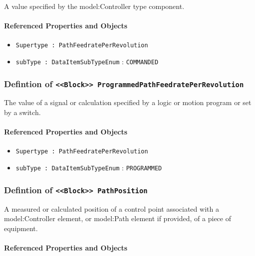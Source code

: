 \FloatBarrier

A value specified by the {model:Controller} type component.

\FloatBarrier
\paragraph{Referenced Properties and Objects}

\begin{itemize}
\item \texttt{Supertype : PathFeedratePerRevolution}

\item \texttt{subType : DataItemSubTypeEnum} : \texttt{COMMANDED}

\end{itemize}
\FloatBarrier
\subsubsection{Defintion of \texttt{<<Block>> ProgrammedPathFeedratePerRevolution}}
  \label{type:ProgrammedPathFeedratePerRevolution}

\FloatBarrier

The value of a signal or calculation specified by a logic or motion program or set by a switch.

\FloatBarrier
\paragraph{Referenced Properties and Objects}

\begin{itemize}
\item \texttt{Supertype : PathFeedratePerRevolution}

\item \texttt{subType : DataItemSubTypeEnum} : \texttt{PROGRAMMED}

\end{itemize}
\FloatBarrier
\subsubsection{Defintion of \texttt{<<Block>> PathPosition}}
  \label{type:PathPosition}

\FloatBarrier

A measured or calculated position of a control point associated with a {model:Controller} element, or {model:Path} element if provided, of a piece of equipment.

\FloatBarrier
\paragraph{Referenced Properties and Objects}

